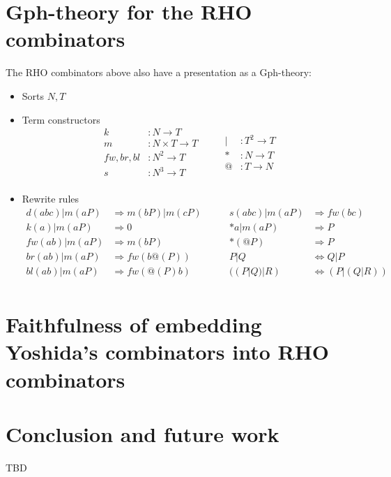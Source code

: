 \documentclass{llncs}
\begin{document}
\section{Gph-theory for the RHO combinators}
The RHO combinators above also have a presentation as a Gph-theory:
\begin{itemize}
  \item Sorts $N, T$
  \item Term constructors
    \[\begin{array}{rl}
      k &: N \to T \\
      m &: N \times T \to T \\
      fw,br,bl &: N^2 \to T \\
      s &: N^3 \to T \\
    \end{array} \quad \quad
    \begin{array}{rl}
      | &: T^2 \to T \\
      * &: N \to T \\
      @ &: T \to N \\
    \end{array}\]
  \item Rewrite rules
    \[\begin{array}{rl}
      d(abc) | m(aP) & \Rightarrow m(bP) | m(cP) \\
      k(a) | m(aP) & \Rightarrow 0 \\
      fw(ab) | m(aP) & \Rightarrow m(bP) \\
      br(ab) | m(aP) & \Rightarrow fw(b@(P)) \\
      bl(ab) | m(aP) & \Rightarrow fw(@(P)b) \\
    \end{array} \quad \quad
    \begin{array}{rl}
      s(abc) | m(aP) & \Rightarrow fw(bc) \\
      *a | m(aP) & \Rightarrow P \\
      *(@P) & \Rightarrow P \\
      P | Q & \Leftrightarrow Q | P \\
      ((P | Q) | R) & \Leftrightarrow (P | (Q | R)) \\
    \end{array}\]
\end{itemize}







\section{Faithfulness of embedding Yoshida's combinators into RHO combinators}

\section{Conclusion and future work}
TBD



\end{document}
